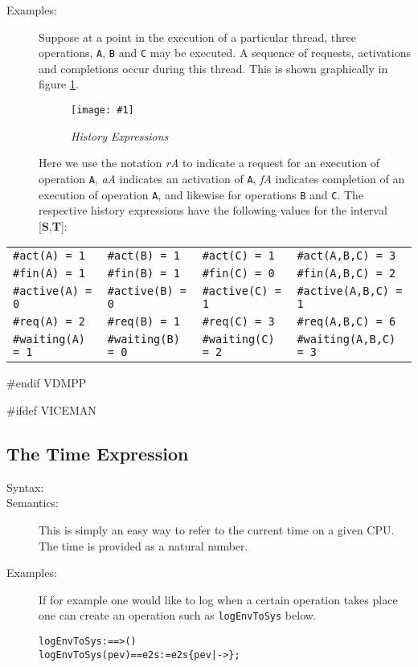 \documentclass[\pformat,12pt]{article}
\newcommand{\insertfig}[4]{ %
\begin{figure}[H]
\begin{center}
\texttt{[image: \#1]} 
\end{center}
\caption{{\em #3}} #4
\end{figure}
}
\begin{document}
\begin{description}
\item[Examples:]Suppose at a point in the execution of a particular
thread, three operations, \texttt{A}, \texttt{B} and \texttt{C} may be
executed. A sequence of requests, activations and completions occur
during this thread. This is shown graphically in figure \ref{historyfig}.

\insertfig{history}{14cm}{History Expressions}{\label{historyfig}}

Here we use the notation \textit{rA} to indicate a request for an
execution of operation \texttt{A}, \textit{aA} indicates an activation
of \texttt{A}, \textit{fA} indicates completion of an execution of
operation \texttt{A}, and likewise for operations \texttt{B} and
\texttt{C}. The respective history expressions have the following
values for the interval [\textbf{S},\textbf{T}]:
\end{description}

\begin{center}\small
\begin{tabular}{llll}
\texttt{\#act(A) = 1} & \texttt{\#act(B) = 1} & \texttt{\#act(C) = 1}
& \texttt{\#act(A,B,C) = 3}\\
\texttt{\#fin(A) = 1} & \texttt{\#fin(B) = 1} & \texttt{\#fin(C) = 0}
& \texttt{\#fin(A,B,C) = 2}\\
\texttt{\#active(A) = 0} & \texttt{\#active(B) = 0} & 
\texttt{\#active(C) = 1} & \texttt{\#active(A,B,C) = 1}\\
\texttt{\#req(A) = 2} & \texttt{\#req(B) = 1} & \texttt{\#req(C) = 3}
& \texttt{\#req(A,B,C) = 6}\\
\texttt{\#waiting(A) = 1} & \texttt{\#waiting(B) = 0} & 
\texttt{\#waiting(C) = 2} & \texttt{\#waiting(A,B,C) = 3}\\
\end{tabular}
\end{center}


#endif VDMPP

#ifdef VICEMAN
\subsection{The Time Expression}\label{sec:time}

\begin{description}
\item[Syntax:] 

\item[Semantics:] This is simply an easy way to refer to the current time on 
     a given CPU. The time is provided as a natural number.
\item[Examples:] If for example one would like to log when a certain operation takes place one can create an operation such as \texttt{logEnvToSys} below.
\begin{alltt}
   logEnvToSys:  ==> ()
  logEnvToSys (pev) == e2s := e2s  \{pev |-> \};
\end{alltt}
\end{description}
\end{document}
